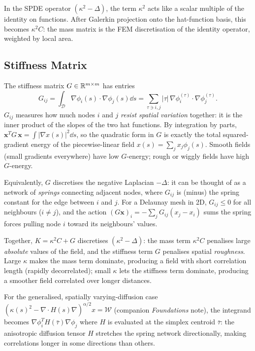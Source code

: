 \documentclass[11pt]{article}
\begin{document}
In the SPDE operator $(\kappa^2 - \Delta)$, the term $\kappa^2$ acts like a
scalar multiple of the identity on functions.  After Galerkin projection onto
the hat-function basis, this becomes $\kappa^2 C$: the mass matrix is the
FEM discretisation of the identity operator, weighted by local area.

\subsection{Stiffness Matrix}
\label{sec:stiffness}

The stiffness matrix $G \in \mathbb{R}^{m\times m}$ has entries
\begin{equation}
  G_{ij} = \int_\mathcal{D} \nabla\phi_i(s) \cdot \nabla\phi_j(s) \dd s
         = \sum_{\tau \ni i,j} |\tau| \, \nabla\phi_i^{(\tau)} \cdot \nabla\phi_j^{(\tau)}.
  \label{eq:stiff}
\end{equation}
$G_{ij}$ measures how much nodes $i$ and $j$ \emph{resist spatial variation}
together: it is the inner product of the slopes of the two hat functions.
By integration by parts, $\mathbf{x}^T G\, \mathbf{x} =
\int|\nabla x(s)|^2\dd s$, so the quadratic form in $G$ is exactly the total
squared-gradient energy of the piecewise-linear field
$x(s)=\sum_j x_j\phi_j(s)$.  Smooth fields (small gradients everywhere) have
low $G$-energy; rough or wiggly fields have high $G$-energy.

Equivalently, $G$ discretises the negative Laplacian $-\Delta$: it can be
thought of as a network of \emph{springs} connecting adjacent nodes, where
$G_{ij}$ is (minus) the spring constant for the edge between $i$ and $j$.
For a Delaunay mesh in 2D, $G_{ij} \le 0$ for all neighbours
($i\neq j$), and the action $(G\mathbf{x})_i = -\sum_j G_{ij}(x_j - x_i)$
sums the spring forces pulling node $i$ toward its neighbours' values.

Together, $K = \kappa^2 C + G$ discretises $(\kappa^2 - \Delta)$: the mass
term $\kappa^2 C$ penalises large \emph{absolute} values of the field, and
the stiffness term $G$ penalises spatial \emph{roughness}.  Large $\kappa$
makes the mass term dominate, producing a field with short correlation length
(rapidly decorrelated); small $\kappa$ lets the stiffness term dominate,
producing a smoother field correlated over longer distances.

For the generalised, spatially varying-diffusion case
$(\kappa(s)^2-\nabla\cdot H(s)\nabla)^{\alpha/2}x=\mathcal{W}$ (companion
\emph{Foundations} note), the integrand becomes
$\nabla\phi_i^T H(\bar\tau) \nabla\phi_j$ where $H$ is evaluated at the
simplex centroid $\bar\tau$: the anisotropic diffusion tensor $H$ stretches
the spring network directionally, making correlations longer in some
directions than others.
\end{document}

